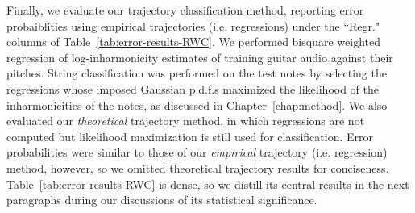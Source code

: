 \documentclass[12pt]{cmuthesis}
\begin{document}
Finally, we evaluate our trajectory classification method, reporting error probaiblities using empirical trajectories (i.e. regressions) under the ``Regr." columns of Table~\ref{tab:error-results-RWC}. We performed bisquare weighted regression of log-inharmonicity estimates of training guitar audio against their pitches. String classification was performed on the test notes by selecting the regressions whose imposed Gaussian p.d.f.s maximized the likelihood of the inharmonicities of the notes, as discussed in Chapter~\ref{chap:method}. We also evaluated our \textit{theoretical} trajectory method, in which regressions are not computed but likelihood maximization is still used for classification. Error probabilities were similar to those of our \textit{empirical} trajectory (i.e. regression) method, however, so we omitted theoretical trajectory results for conciseness. Table~\ref{tab:error-results-RWC} is dense, so we distill its central results in the next paragraphs during our discussions of its statistical significance.
\end{document}
